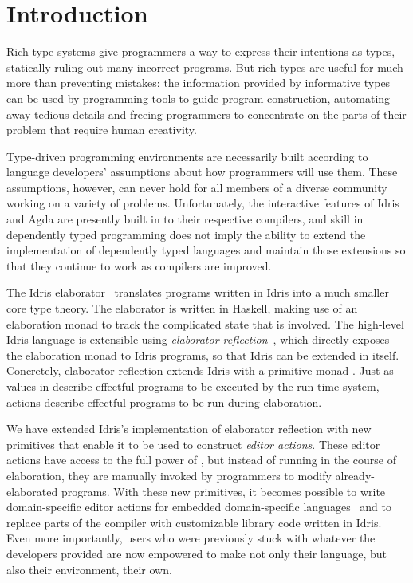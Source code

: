 \section{Introduction} \label{sec:introduction}

Rich type systems give programmers a way to express their intentions
as types, statically ruling out many incorrect programs. But rich
types are useful for much more than preventing mistakes: the
information provided by informative types can be used by programming
tools to guide program construction, automating away tedious details
and freeing programmers to concentrate on the parts of their
problem that require human creativity.

Type-driven programming environments are necessarily built according
to language developers' assumptions about how programmers will use
them. These assumptions, however, can never hold for all members of a
diverse community working on a variety of problems. Unfortunately, the
interactive features of Idris and Agda are presently built in to their
respective compilers, and skill in dependently typed programming does
not imply the ability to extend the implementation of dependently
typed languages and maintain those extensions so that they continue to
work as compilers are improved.

The Idris elaborator~\citep{idris} translates programs written in
Idris into a much smaller core type theory. The elaborator is written
in Haskell, making use of an elaboration monad to track the
complicated state that is involved. The high-level Idris language is
extensible using \emph{elaborator reflection}~\citep{davidphd,
  elabref}, which directly exposes the elaboration monad to Idris
programs, so that Idris can be extended in itself. Concretely,
elaborator reflection extends Idris with a primitive monad
\Elab{}. Just as values in \IO{} describe effectful programs to be
executed by the run-time system, \Elab{} actions describe effectful
programs to be run during elaboration.

We have extended Idris's implementation of elaborator reflection with
new primitives that enable it to be used to construct \emph{editor
  actions}. These editor actions have access to the full power of
\Elab{}, but instead of running in the course of elaboration, they are
manually invoked by programmers to modify already-elaborated programs.
With these new primitives, it becomes possible to write
domain-specific editor actions for embedded domain-specific
languages~\citep{dsel} and to replace parts of the compiler with
customizable library code written in Idris. Even more importantly,
users who were previously stuck with whatever the developers provided
are now empowered to make not only their language, but also their
environment, their own.

